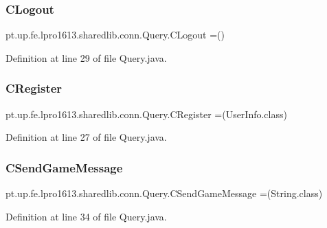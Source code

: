 \subsubsection{\texorpdfstring{C\+Logout}{CLogout}}
{\footnotesize\ttfamily pt.\+up.\+fe.\+lpro1613.\+sharedlib.\+conn.\+Query.\+C\+Logout =()}



Definition at line 29 of file Query.\+java.

\hypertarget{enumpt_1_1up_1_1fe_1_1lpro1613_1_1sharedlib_1_1conn_1_1_query_aa654294e91df382d4d478f1ccddea77b}{}\label{enumpt_1_1up_1_1fe_1_1lpro1613_1_1sharedlib_1_1conn_1_1_query_aa654294e91df382d4d478f1ccddea77b} 
\subsubsection{\texorpdfstring{C\+Register}{CRegister}}
{\footnotesize\ttfamily pt.\+up.\+fe.\+lpro1613.\+sharedlib.\+conn.\+Query.\+C\+Register =(User\+Info.\+class)}



Definition at line 27 of file Query.\+java.

\hypertarget{enumpt_1_1up_1_1fe_1_1lpro1613_1_1sharedlib_1_1conn_1_1_query_a73b9f9a48ed316b294a1ed7f6b08fed0}{}\label{enumpt_1_1up_1_1fe_1_1lpro1613_1_1sharedlib_1_1conn_1_1_query_a73b9f9a48ed316b294a1ed7f6b08fed0} 
\subsubsection{\texorpdfstring{C\+Send\+Game\+Message}{CSendGameMessage}}
{\footnotesize\ttfamily pt.\+up.\+fe.\+lpro1613.\+sharedlib.\+conn.\+Query.\+C\+Send\+Game\+Message =(String.\+class)}



Definition at line 34 of file Query.\+java.

\hypertarget{enumpt_1_1up_1_1fe_1_1lpro1613_1_1sharedlib_1_1conn_1_1_query_a3a8111ba44393eb51bf1152e00787cae}{}\label{enumpt_1_1up_1_1fe_1_1lpro1613_1_1sharedlib_1_1conn_1_1_query_a3a8111ba44393eb51bf1152e00787cae} 
